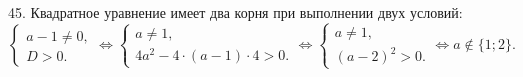 45. Квадратное уравнение имеет два корня при выполнении двух условий:\\ $\begin{cases}a-1\neq0,\\ D>0.\end{cases}\Leftrightarrow
\begin{cases}a\neq1,\\ 4a^2-4\cdot(a-1)\cdot4>0.\end{cases}\Leftrightarrow
\begin{cases}a\neq1,\\ (a-2)^2>0.\end{cases}\Leftrightarrow a\notin\{1;2\}.$\\
